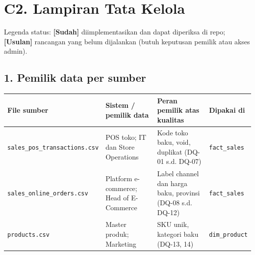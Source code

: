 \documentclass[10pt,a4paper]{article}
\begin{document}
\clearpage
\section{C2. Lampiran Tata Kelola}\label{c2.-lampiran-tata-kelola}

Legenda status: \textbf{{[}Sudah{]}} diimplementasikan dan dapat diperiksa di repo; \textbf{{[}Usulan{]}} rancangan yang belum dijalankan (butuh keputusan pemilik atau akses admin).

\subsection{1. Pemilik data per sumber}\label{pemilik-data-per-sumber}

{\def\LTcaptype{none} %
\begin{longtable}[]{@{}
  >{\raggedright\arraybackslash}p{}
  >{\raggedright\arraybackslash}p{}
  >{\raggedright\arraybackslash}p{}
  >{\raggedright\arraybackslash}p{}@{}}
\toprule\noalign{}
\begin{minipage}[b]{\linewidth}\raggedright
File sumber
\end{minipage} & \begin{minipage}[b]{\linewidth}\raggedright
Sistem / pemilik data
\end{minipage} & \begin{minipage}[b]{\linewidth}\raggedright
Peran pemilik atas kualitas
\end{minipage} & \begin{minipage}[b]{\linewidth}\raggedright
Dipakai di
\end{minipage} \\
\midrule\noalign{}
\endhead
\bottomrule\noalign{}
\endlastfoot
\texttt{sales\_\allowbreak{}pos\_\allowbreak{}transactions.csv} & POS toko; IT dan Store Operations & Kode toko baku, void, duplikat (DQ-01 s.d. DQ-07) & \texttt{fact\_\allowbreak{}sales} \\
\texttt{sales\_\allowbreak{}online\_\allowbreak{}orders.csv} & Platform e-commerce; Head of E-Commerce & Label channel dan harga baku, provinsi (DQ-08 s.d. DQ-12) & \texttt{fact\_\allowbreak{}sales} \\
\texttt{products.csv} & Master produk; Marketing & SKU unik, kategori baku (DQ-13, 14) & \texttt{dim\_\allowbreak{}product} \\

\end{longtable}}
\end{document}

